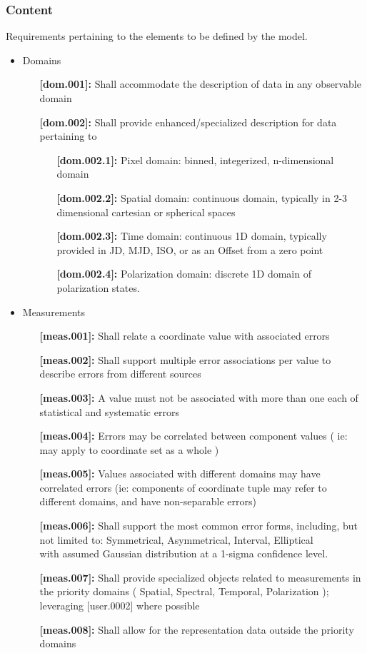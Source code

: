 \documentclass[11pt,a4paper]{ivoa}
\begin{document}
\subsubsection{Content}
Requirements pertaining to the elements to be defined by the model.
\begin{itemize}
  \item Domains
  \begin{itemize}
    \item [\textbf{[dom.001]:}] Shall accommodate the description of data in any observable domain
    \item [\textbf{[dom.002]:}] Shall provide enhanced/specialized description for data pertaining to
    \begin{itemize}
      \item [\textbf{[dom.002.1]:}] Pixel domain: binned, integerized, n-dimensional domain
      \item [\textbf{[dom.002.2]:}] Spatial domain: continuous domain, typically in 2-3 dimensional cartesian or spherical spaces
      \item [\textbf{[dom.002.3]:}] Time domain: continuous 1D domain, typically provided in JD, MJD, ISO, or as an Offset from a zero point
      \item [\textbf{[dom.002.4]:}] Polarization domain: discrete 1D domain of polarization states. 
    \end{itemize}
  \end{itemize}

  \item Measurements
  \begin{itemize}
    \item [\textbf{[meas.001]:}] Shall relate a coordinate value with associated errors
    \item [\textbf{[meas.002]:}] Shall support multiple error associations per value to describe errors from different sources
    \item [\textbf{[meas.003]:}] A value must not be associated with more than one each of statistical and systematic errors
    \item [\textbf{[meas.004]:}] Errors may be correlated between component values ( ie: may apply to coordinate set as a whole )
    \item [\textbf{[meas.005]:}] Values associated with different domains may have correlated errors (ie: components of coordinate tuple may refer to different domains, and have non-separable errors)
    \item [\textbf{[meas.006]:}] Shall support the most common error forms, including, but not limited to: Symmetrical, Asymmetrical, Interval, Elliptical \\ with assumed Gaussian distribution at a 1-sigma confidence level.
    \item [\textbf{[meas.007]:}] Shall provide specialized objects related to measurements in the priority domains ( Spatial, Spectral, Temporal, Polarization ); leveraging [user.0002] where possible
    \item [\textbf{[meas.008]:}] Shall allow for the representation data outside the priority domains 
  \end{itemize}
\end{itemize}
\end{document}
